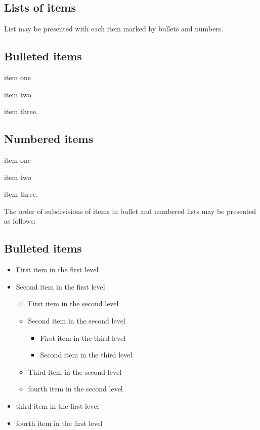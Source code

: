 \documentclass{IJCS_template}
\begin{document}
\subsection{Lists of items}
List may be presented with each item marked by bullets and numbers.

\subsection*{Bulleted items}

\begin{itemlist}
\item item one
\item item two
\item item three.
\end{itemlist}

\subsection*{Numbered items}

\begin{arabiclist}
\item item one
\item item two
\item item three.
\end{arabiclist}

The order of subdivisions of items in bullet and numbered lists may be
presented as follows:

\subsection*{Bulleted items}

\begin{itemize}
\item First item in the first level
\item Second item in the first level
\begin{itemize}
\item First item in the second level
\item Second item in the second level
\begin{itemize}
\item First item in the third level
\item Second item in the third level
\end{itemize}
\item Third item in the second level
\item fourth item in the second level
\end{itemize}
\item third item in the first level
\item fourth item in the first level
\end{itemize}
\end{document}
